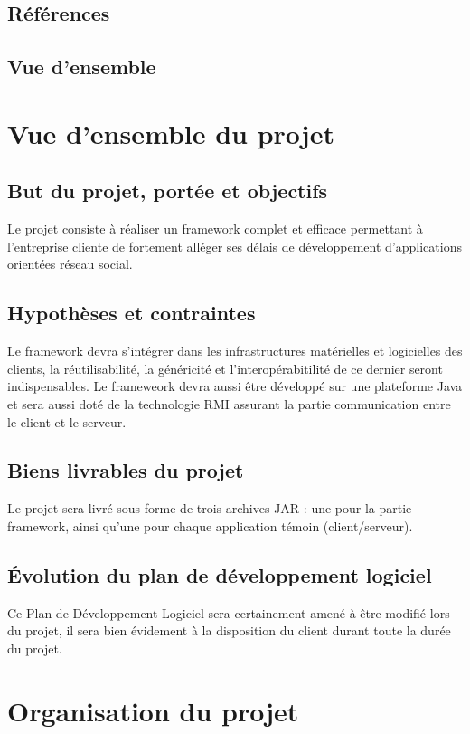 \documentclass[a4paper,10pt,twoside]{article}
\begin{document}
\subsection{Références}
\subsection{Vue d’ensemble}

\section{Vue d’ensemble du projet}
\subsection{But du projet, portée et objectifs}
Le projet consiste à réaliser un framework complet et efficace permettant à l'entreprise cliente de fortement alléger ses délais de développement d'applications orientées réseau social.

\subsection{Hypothèses et contraintes}
Le framework devra s'intégrer dans les infrastructures matérielles et logicielles des clients, la réutilisabilité, la généricité et l'interopérabitilité de ce dernier seront indispensables.
Le frameweork devra aussi être développé sur une plateforme Java et sera aussi doté de la technologie RMI assurant la partie communication entre le client et le serveur.

\subsection{Biens livrables du projet}
Le projet sera livré sous forme de trois archives JAR : une pour la partie framework,
ainsi qu'une pour chaque application témoin (client/serveur).

\subsection{Évolution du plan de développement logiciel}
Ce Plan de Développement Logiciel sera certainement amené à être modifié lors du projet, il sera bien évidement à la disposition du client durant toute la durée du projet.

\section{Organisation du projet}
\end{document}
